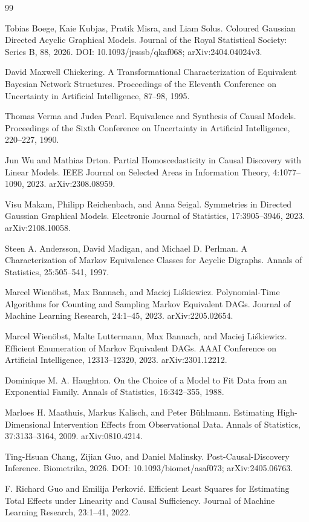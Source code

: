 \documentclass{article}
\begin{document}
\begin{thebibliography}{99}

   Tobias Boege, Kaie Kubjas, Pratik Misra, and Liam Solus. Coloured Gaussian Directed Acyclic Graphical Models. Journal of the Royal Statistical Society: Series B, 88, 2026. DOI: 10.1093/jrsssb/qkaf068; arXiv:2404.04024v3.

   David Maxwell Chickering. A Transformational Characterization of Equivalent Bayesian Network Structures. Proceedings of the Eleventh Conference on Uncertainty in Artificial Intelligence, 87--98, 1995.

   Thomas Verma and Judea Pearl. Equivalence and Synthesis of Causal Models. Proceedings of the Sixth Conference on Uncertainty in Artificial Intelligence, 220--227, 1990.

   Jun Wu and Mathias Drton. Partial Homoscedasticity in Causal Discovery with Linear Models. IEEE Journal on Selected Areas in Information Theory, 4:1077--1090, 2023. arXiv:2308.08959.

   Visu Makam, Philipp Reichenbach, and Anna Seigal. Symmetries in Directed Gaussian Graphical Models. Electronic Journal of Statistics, 17:3905--3946, 2023. arXiv:2108.10058.

   Steen A. Andersson, David Madigan, and Michael D. Perlman. A Characterization of Markov Equivalence Classes for Acyclic Digraphs. Annals of Statistics, 25:505--541, 1997.

   Marcel Wienöbst, Max Bannach, and Maciej Liśkiewicz. Polynomial-Time Algorithms for Counting and Sampling Markov Equivalent DAGs. Journal of Machine Learning Research, 24:1--45, 2023. arXiv:2205.02654.

   Marcel Wienöbst, Malte Luttermann, Max Bannach, and Maciej Liśkiewicz. Efficient Enumeration of Markov Equivalent DAGs. AAAI Conference on Artificial Intelligence, 12313--12320, 2023. arXiv:2301.12212.

   Dominique M. A. Haughton. On the Choice of a Model to Fit Data from an Exponential Family. Annals of Statistics, 16:342--355, 1988.

   Marloes H. Maathuis, Markus Kalisch, and Peter Bühlmann. Estimating High-Dimensional Intervention Effects from Observational Data. Annals of Statistics, 37:3133--3164, 2009. arXiv:0810.4214.

   Ting-Hsuan Chang, Zijian Guo, and Daniel Malinsky. Post-Causal-Discovery Inference. Biometrika, 2026. DOI: 10.1093/biomet/asaf073; arXiv:2405.06763.

   F. Richard Guo and Emilija Perković. Efficient Least Squares for Estimating Total Effects under Linearity and Causal Sufficiency. Journal of Machine Learning Research, 23:1--41, 2022.

\end{thebibliography}
\end{document}
